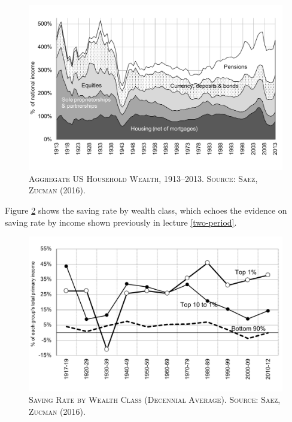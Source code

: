 \documentclass[]{book}
\begin{document}
\begin{figure}

{\centering \includegraphics[width=1\linewidth,height=1\textheight]{figures/SaezZucman2016/fig2} 

}

\caption{\textsc{Aggregate US Household Wealth,
1913--2013. Source: Saez, Zucman (2016)}.}\label{fig:saez-zucman-fig2}
\end{figure}

Figure \ref{fig:saez-zucman-fig9a} shows the saving rate by wealth
class, which echoes the evidence on saving rate by income shown
previously in lecture \ref{two-period}.




\begin{figure}

{\centering \includegraphics[width=1\linewidth,height=1\textheight]{figures/SaezZucman2016/fig9a} 

}

\caption{\textsc{Saving Rate by Wealth Class (Decennial
Average). Source: Saez, Zucman (2016)}.}\label{fig:saez-zucman-fig9a}
\end{figure}
\end{document}
